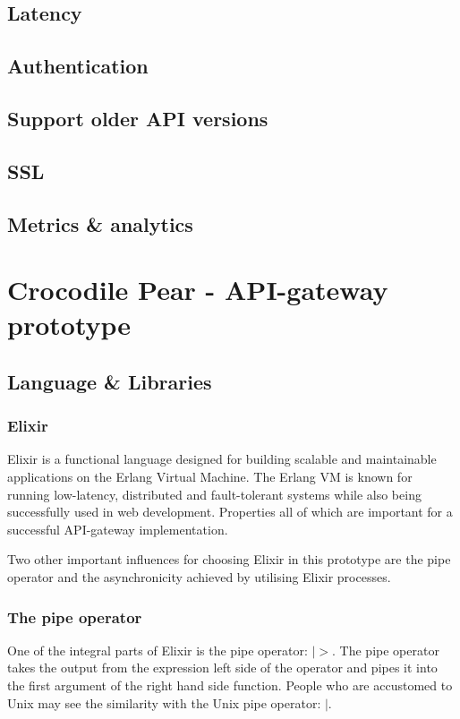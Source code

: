 \documentclass{cslthse-msc}
\begin{document}
\section{Latency}

\section{Authentication}

\section{Support older API versions}

\section{SSL}

\section{Metrics \& analytics}

\chapter{Crocodile Pear - API-gateway prototype}

\section{Language \& Libraries}
\subsection{Elixir}
Elixir is a functional language designed for building scalable and maintainable applications on the Erlang Virtual Machine. The Erlang VM is known for running low-latency, distributed and fault-tolerant systems while also being successfully used in web development\cite{elixir}. Properties all of which are important for a successful API-gateway implementation.

Two other important influences for choosing Elixir in this prototype are the pipe operator and the asynchronicity achieved by utilising Elixir processes.

\subsection{The pipe operator}
One of the integral parts of Elixir is the pipe operator: $|>$. The pipe operator takes the output from the expression left side of the operator and pipes it into the first argument of the right hand side function. People who are accustomed to Unix may see the similarity with the Unix pipe operator: $|$.
\end{document}
